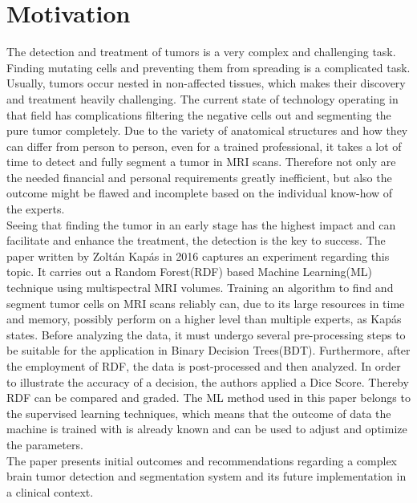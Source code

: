 \documentclass[
12pt,
headsepline,
bibliography=totoc,
twoside=semi,
]{scrartcl}
\begin{document}

\section{Motivation\label{sec:sec1}}
The detection and treatment of tumors is a very complex and challenging task. Finding mutating cells and preventing them from spreading is a complicated task. Usually, tumors occur nested in non-affected tissues, which makes their discovery and treatment heavily challenging. The current state of technology operating in that field has complications filtering the negative cells out and segmenting the pure tumor completely. Due to the variety of anatomical structures and how they can differ from person to person, even for a trained professional, it takes a lot of time to detect and fully segment a tumor in MRI scans. Therefore not only are the needed financial and personal requirements greatly inefficient, but also the outcome might be flawed and incomplete based on the individual know-how of the experts.\\

Seeing that finding the tumor in an early stage has the highest impact and can facilitate and enhance the treatment, the detection is the key to success. The paper written by Zoltán Kapás in 2016 captures an experiment regarding this topic. It carries out a Random Forest(RDF) based Machine Learning(ML) technique using multispectral MRI volumes. Training an algorithm to find and segment tumor cells on MRI scans reliably can, due to its large resources in time and memory, possibly perform on a higher level than multiple experts, as Kapás states. Before analyzing the data, it must undergo several pre-processing steps to be suitable for the application in Binary Decision Trees(BDT). Furthermore, after the employment of RDF, the data is post-processed and then analyzed. In order to illustrate the accuracy of a decision, the authors applied a Dice Score. Thereby RDF can be compared and graded. The ML method used in this paper belongs to the supervised learning techniques, which means that the outcome of data the machine is trained with is already known and can be used to adjust and optimize the parameters.\\

The paper presents initial outcomes and recommendations regarding a complex brain tumor detection and segmentation system and its future implementation in a clinical context.
\end{document}
